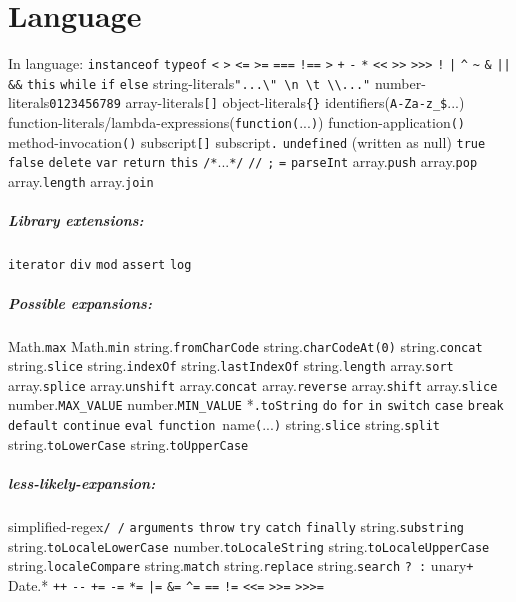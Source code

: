 \chapter{Language}

In language:
\verb|instanceof|
\verb|typeof|
\verb|<|
\verb|>|
\verb|<=| 
\verb|>=|
\verb|===|
\verb|!==|
\verb|>|
\verb|+|
\verb|-|
\verb|*|
\verb|<<|
\verb|>>|
\verb|>>>|
\verb|!|
\verb$|$
\verb|^|
\verb|~|
\verb|&|
\verb$||$ 
\verb|&&|
\verb|this|
\verb|while|
\verb|if| \verb|else|
string-literals\verb|"...\" \n \t \\..."|
number-literals\verb|0123456789|
array-literals\verb|[]|
object-literals\verb|{}|
identifiers(\verb|A-Za-z_$|...)
function-literals/lambda-expressions(\verb|function(|...\verb|)|)
function-application\verb|()|
method-invocation\verb|()|
subscript\verb|[]|
subscript\verb|.|
\verb|undefined| (written as null)
\verb|true|
\verb|false|
\verb|delete|
\verb|var|
\verb|return|
\verb|this|
\verb|/*|...\verb|*/|
\verb|//|
\verb|;|
\verb|=|
\verb|parseInt|
array.\verb|push|
array.\verb|pop|
array.\verb|length|
array.\verb|join|


\paragraph{Library extensions:}
\verb|iterator|
\verb|div|
\verb|mod|
\verb|assert|
\verb|log|


\paragraph{Possible expansions:}
Math.\verb|max|
Math.\verb|min|
string.\verb|fromCharCode|
string.\verb|charCodeAt(0)|
string.\verb|concat|
string.\verb|slice|
string.\verb|indexOf|
string.\verb|lastIndexOf|
string.\verb|length|
array.\verb|sort|
array.\verb|splice|
array.\verb|unshift|
array.\verb|concat|
array.\verb|reverse|
array.\verb|shift|
array.\verb|slice|
number.\verb|MAX_VALUE|
number.\verb|MIN_VALUE|
*\verb|.toString|
\verb|do|
\verb|for|
\verb|in|
\verb|switch|
\verb|case|
\verb|break|
\verb|default|
\verb|continue|
\verb|eval|
\verb|function|~name\verb|(|...\verb|)|
string.\verb|slice|
string.\verb|split|
string.\verb|toLowerCase|
string.\verb|toUpperCase|

\paragraph{less-likely-expansion:}
simplified-regex\verb|/ /|
\verb|arguments|
\verb|throw|
\verb|try|
\verb|catch|
\verb|finally|
string.\verb|substring|
string.\verb|toLocaleLowerCase|
number.\verb|toLocaleString|
string.\verb|toLocaleUpperCase|
string.\verb|localeCompare|
string.\verb|match|
string.\verb|replace|
string.\verb|search|
\verb|? :|
unary\verb|+|
Date.*
\verb|++|
\verb|--|
\verb|+=|
\verb|-=|
\verb|*=|
\verb$|=$
\verb|&=|
\verb|^=|
\verb|==|
\verb|!=|
\verb|<<=|
\verb|>>=|
\verb|>>>=|



